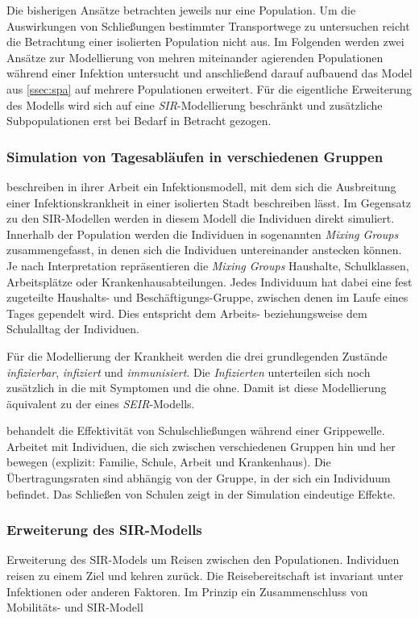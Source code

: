 Die bisherigen Ansätze betrachten jeweils nur eine Population. Um die Auswirkungen von Schließungen bestimmter Transportwege zu untersuchen reicht die Betrachtung einer isolierten Population nicht aus. Im Folgenden werden zwei Ansätze zur Modellierung von mehren miteinander agierenden Populationen während einer Infektion untersucht und anschließend darauf aufbauend das Model aus \ref{ssec:spa} auf mehrere Populationen erweitert. Für die eigentliche Erweiterung des Modells wird sich auf eine \emph{SIR}-Modellierung beschränkt und zusätzliche Subpopulationen erst bei Bedarf in Betracht gezogen.
\subsubsection{Simulation von Tagesabläufen in verschiedenen Gruppen}
\cite{Capasso1978} beschreiben in ihrer Arbeit ein Infektionsmodell, mit dem sich die Ausbreitung einer Infektionskrankheit in einer isolierten Stadt beschreiben lässt. Im Gegensatz zu den SIR-Modellen werden in diesem Modell die Individuen direkt simuliert. Innerhalb der Population werden die Individuen in sogenannten \emph{Mixing Groups} zusammengefasst, in denen sich die Individuen untereinander anstecken können. Je nach Interpretation repräsentieren die \emph{Mixing Groups} Haushalte, Schulklassen, Arbeitsplätze oder Krankenhausabteilungen. Jedes Individuum hat dabei eine fest zugeteilte Haushalts- und Beschäftigungs-Gruppe, zwischen denen im Laufe eines Tages gependelt wird. Dies entspricht dem Arbeits- beziehungsweise dem Schulalltag der Individuen.

Für die Modellierung der Krankheit werden die drei grundlegenden Zustände \emph{infizierbar}, \emph{infiziert} und \emph{immunisiert}. Die \emph{Infizierten} unterteilen sich noch zusätzlich in die mit Symptomen und die ohne. Damit ist diese Modellierung äquivalent zu der eines \emph{SEIR}-Modells.


behandelt die Effektivität von Schulschließungen während einer Grippewelle. Arbeitet mit Individuen, die sich zwischen verschiedenen Gruppen hin und her bewegen (explizit: Familie, Schule, Arbeit und Krankenhaus). Die Übertragungsraten sind abhängig von der Gruppe, in der sich ein Individuum befindet. Das Schließen von Schulen zeigt in der Simulation eindeutige Effekte.
\subsubsection{Erweiterung des SIR-Modells}
\cite{Sattenspiel1995} Erweiterung des SIR-Models um Reisen zwischen den Populationen. Individuen reisen zu einem Ziel und kehren zurück. Die Reisebereitschaft ist invariant unter Infektionen oder anderen Faktoren. Im Prinzip ein Zusammenschluss von Mobilitäts- und SIR-Modell

